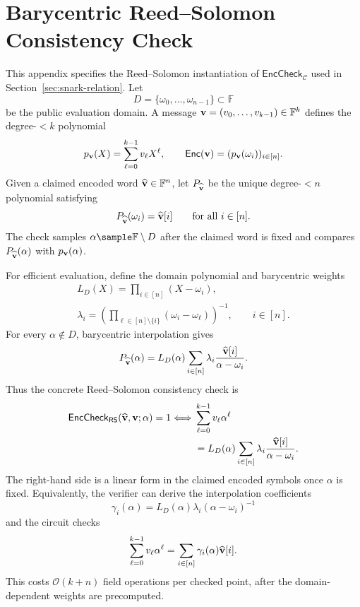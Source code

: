 \section{Barycentric Reed--Solomon Consistency Check}
\label{app:rs-barycentric}

This appendix specifies the Reed--Solomon instantiation of
\(\mathsf{EncCheck}_{\mathcal{C}}\) used in
Section~\ref{sec:snark-relation}.  Let
\[
D=\{\omega_0,\ldots,\omega_{n-1}\}\subset\mathbb{F}
\]
be the public evaluation domain.  A message
\(\mathbf{v}=(v_0,\ldots,v_{k-1})\in\mathbb{F}^k\) defines the degree-\(<k\)
polynomial
\[
  p_{\mathbf{v}}(X)=\sum_{\ell=0}^{k-1} v_\ell X^\ell,
  \qquad
  \mathsf{Enc}(\mathbf{v})=(p_{\mathbf{v}}(\omega_i))_{i\in[n]}.
\]
Given a claimed encoded word
\(\widehat{\mathbf{v}}\in\mathbb{F}^n\), let
\(P_{\widehat{\mathbf{v}}}\) be the unique degree-\(<n\) polynomial satisfying
\[
  P_{\widehat{\mathbf{v}}}(\omega_i)=\widehat{\mathbf{v}}[i]
  \qquad\text{for all }i\in[n].
\]
The check samples \(\alpha\sample\mathbb{F}\setminus D\) after the claimed
word is fixed and compares \(P_{\widehat{\mathbf{v}}}(\alpha)\) with
\(p_{\mathbf{v}}(\alpha)\).

For efficient evaluation, define the domain polynomial and barycentric weights
\[
\begin{gathered}
  L_D(X)=\prod_{i\in[n]}(X-\omega_i),
  \\
  \lambda_i
  =
  \left(\prod_{\ell\in[n]\setminus\{i\}}(\omega_i-\omega_\ell)\right)^{-1},
  \qquad i\in[n].
\end{gathered}
\]
For every \(\alpha\notin D\), barycentric interpolation gives
\[
  P_{\widehat{\mathbf{v}}}(\alpha)
  =
  L_D(\alpha)
  \sum_{i\in[n]}
  \lambda_i
  \frac{\widehat{\mathbf{v}}[i]}{\alpha-\omega_i}.
\]
Thus the concrete Reed--Solomon consistency check is
\[
\begin{aligned}
\mathsf{EncCheck}_{\mathsf{RS}}
(\widehat{\mathbf{v}},\mathbf{v};\alpha)=1
\Longleftrightarrow{}&
\sum_{\ell=0}^{k-1} v_\ell \alpha^\ell
\\
&=
L_D(\alpha)
  \sum_{i\in[n]}
\lambda_i
\frac{\widehat{\mathbf{v}}[i]}{\alpha-\omega_i}.
\end{aligned}
\]
The right-hand side is a linear form in the claimed encoded symbols once
\(\alpha\) is fixed.  Equivalently, the verifier can derive the interpolation
coefficients
\[
  \gamma_i(\alpha)
  =
  L_D(\alpha)\lambda_i(\alpha-\omega_i)^{-1}
\]
and the circuit checks
\[
  \sum_{\ell=0}^{k-1} v_\ell \alpha^\ell
  =
  \sum_{i\in[n]}\gamma_i(\alpha)\widehat{\mathbf{v}}[i].
\]
This costs \(\mathcal{O}(k+n)\) field operations per checked point, after the
domain-dependent weights are precomputed.

